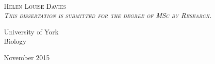 
{
\pagestyle{empty}

\centering
\null\vfill


\fontsize{36.5}{34}\scshape{}
\\[2cm]%

\fontsize{24}{30}\normalfont
Helen Louise Davies\\[0.5cm]%

\fontsize{13}{16}\itshape
This dissertation is submitted for the degree of MSc by Research.

\vfill


\fontsize{16}{20}\normalfont
University of York\\
Biology


\vfill

\fontsize{20}{30}\normalfont
November 2015

\vfill\null

\restoregeometry
}